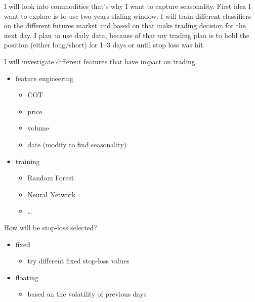 \documentclass[final,2p]{elsarticle}
\begin{document}
I will look into commodities that's why I want to capture seasonality.
First idea I want to explore is to use two years sliding window. I will train different classifiers on the different futures market and 
based on that make trading decision for the next day. I plan to use daily data, because of that my trading plan is to hold the position (either long/short) for 1--3 days or until stop loss was hit.

I will investigate different features that have impact on trading.

\begin{itemize}
    \item feature engineering
    \begin{itemize}
        \item COT
        \item price
        \item volume
        \item date (modify to find seasonality)
    \end{itemize}
    \item training
    \begin{itemize}
        \item Random Forest
        \item Neural Network
        \item \ldots
    \end{itemize}
\end{itemize}

How will be stop-loss selected?
\begin{itemize}
    \item fixed
        \begin{itemize}
            \item try different fixed stop-loss values
        \end{itemize}
    \item floating
        \begin{itemize}
            \item based on the volatility of previous days
        \end{itemize}
\end{itemize}
\end{document}
